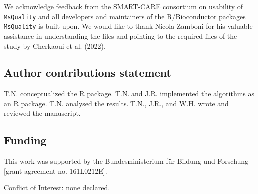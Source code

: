 \documentclass{bioinfo}
\begin{document}
We acknowledge feedback from the SMART-CARE consortium on usability of 
\texttt{MsQuality} and all developers and maintainers of the R/Bioconductor 
packages \texttt{MsQuality} is built upon. We would like to thank Nicola Zamboni
for his valuable assistance in understanding the files and pointing to the 
required files of the study by Cherkaoui et al. (2022).

\subsection{Author contributions statement}

T.N. conceptualized the R package. T.N. and J.R. implemented the algorithms as 
an R package. T.N. analysed the results. T.N., J.R., and W.H. wrote and 
reviewed the manuscript.

\subsection{Funding}

This work was supported by the Bundesministerium für Bildung und Forschung 
[grant agreement no. 161L0212E].

Conflict of Interest: none declared.
\end{document}
